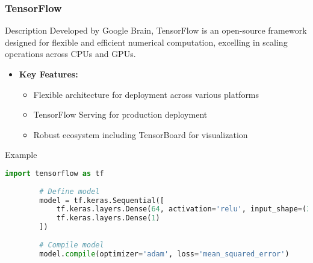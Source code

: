 \documentclass[aspectratio=169]{beamer}
\begin{document}
\begin{frame}[fragile]
    \frametitle{TensorFlow}
    \begin{block}{Description}
        Developed by Google Brain, TensorFlow is an open-source framework designed for flexible and efficient numerical computation, excelling in scaling operations across CPUs and GPUs.
    \end{block}
    \begin{itemize}
        \item \textbf{Key Features:}
            \begin{itemize}
                \item Flexible architecture for deployment across various platforms
                \item TensorFlow Serving for production deployment
                \item Robust ecosystem including TensorBoard for visualization
            \end{itemize}
    \end{itemize}
    \begin{block}{Example}
        \begin{lstlisting}[language=Python]
        import tensorflow as tf
        
        # Define model
        model = tf.keras.Sequential([
            tf.keras.layers.Dense(64, activation='relu', input_shape=(32,)),
            tf.keras.layers.Dense(1)
        ])
        
        # Compile model
        model.compile(optimizer='adam', loss='mean_squared_error')
        \end{lstlisting}
    \end{block}
\end{frame}
\end{document}
